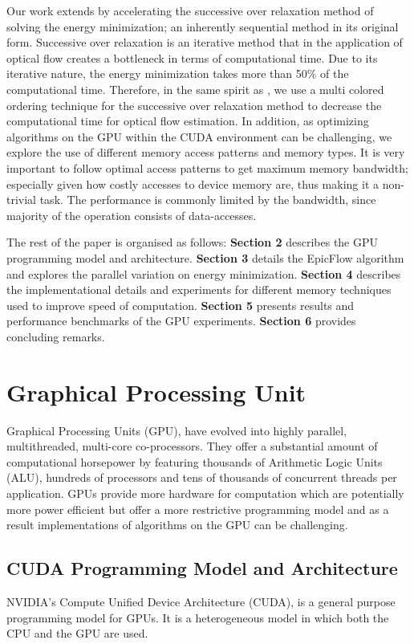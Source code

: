 \documentclass[english]{article}
\begin{document}
	Our work extends \cite{1} by accelerating the successive over relaxation method of solving the energy minimization; an inherently sequential method in its original form. Successive over relaxation is an iterative method that in the application of optical flow creates a bottleneck in terms of computational time. Due to its iterative nature, the energy minimization takes more than 50\% of the computational time. Therefore, in the same spirit as \cite{2}, we use a multi colored ordering technique for the successive over relaxation method to decrease the computational time for optical flow estimation. In addition, as optimizing algorithms on the GPU within the CUDA environment can be challenging, we explore the use of different memory access patterns and memory types. It is very important to follow optimal access patterns to get maximum memory bandwidth; especially given how costly accesses to device memory are, thus making it a non-trivial task. The performance is commonly limited by the bandwidth, since majority of the operation consists of data-accesses.\newline

	The rest of the paper is organised as follows: \textbf{Section 2} describes the GPU programming model and architecture. \textbf{Section 3} details the EpicFlow algorithm and explores the parallel variation on energy minimization. \textbf{Section 4} describes the implementational details and experiments for different memory techniques used to improve speed of computation. \textbf{Section 5} presents results and performance benchmarks of the GPU experiments. \textbf{Section 6} provides concluding remarks.
    
	\section{Graphical Processing Unit}
	Graphical Processing Units (GPU), have evolved into highly parallel, multithreaded, multi-core co-processors. They offer a substantial amount of computational horsepower by featuring thousands of Arithmetic Logic Units (ALU), hundreds of processors and tens of thousands of concurrent threads per application. GPUs provide more hardware for computation which are potentially more power efficient but offer a more restrictive programming model and as a result implementations of algorithms on the GPU can be challenging.

	\subsection{CUDA Programming Model and Architecture}
	NVIDIA’s Compute Unified Device Architecture (CUDA), is a general purpose programming model for GPUs. It is a heterogeneous model in which both the CPU and the GPU are used. \newline
\end{document}
